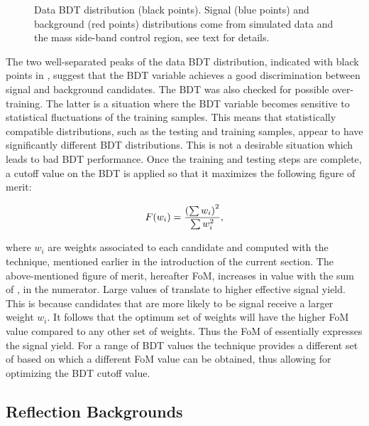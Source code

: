 \begin{figure}[!t]
\centering
  \scalebox{1}{}
  \caption{Data BDT distribution (black points). Signal (blue points) and background (red points) distributions
           come from simulated data and the \Bs mass side-band control region, see text for details.}
  \label{BTDG_performance}
\end{figure}

The two well-separated peaks of the data BDT distribution, indicated with black points in , suggest
that the BDT variable achieves a good discrimination between signal and background candidates.
The BDT was also checked for possible over-training. The latter is a situation where the BDT variable becomes sensitive
to statistical fluctuations of the training samples. This means that statistically compatible distributions, such as
the testing and training samples, appear to have significantly different BDT distributions. This is not a desirable
situation which leads to bad BDT performance. Once the training and testing steps are complete, a cutoff value on the
BDT is applied so that it maximizes the following figure of merit:

\begin{equation}
  \centering
  F(w_i) = \frac{\left(\sum{w_{i}}\right)^2}{\sum{w_{i}^2}},
\label{eqn:fom}
\end{equation}

\noindent where $w_i$ are weights associated to each candidate and computed with the \sPlot technique,
mentioned earlier in the introduction of the current section. The above-mentioned figure of merit, hereafter FoM, increases in value with
the sum of \sWeights, in the numerator. Large values of \sWeights translate to higher effective signal yield.
This is because candidates that are more likely to be signal receive a larger weight $w_i$. It follows that the
optimum set of weights will have the higher FoM value compared to any other set of weights. Thus the FoM
of  essentially expresses the signal yield. For a range of BDT values the \sPlot technique
provides a different set of \sWeights based on which a different FoM value can be obtained, thus allowing for
optimizing the BDT cutoff value.

\subsection{Reflection Backgrounds}
\label{peaking_backgrounds}

